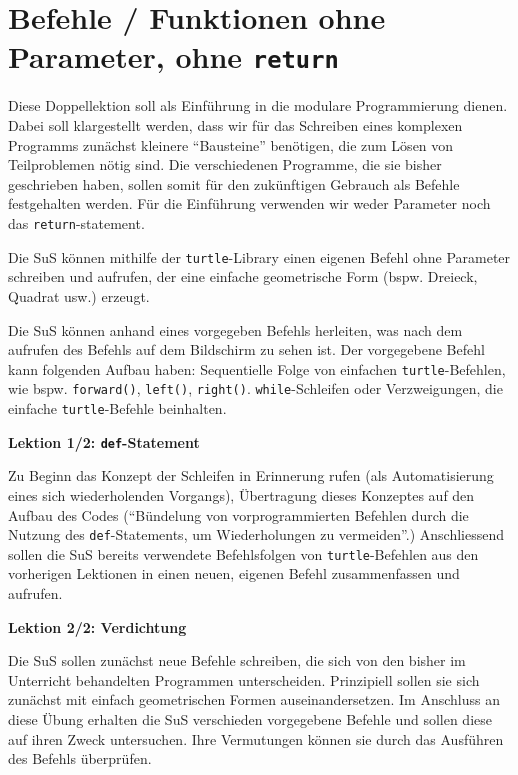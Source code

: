 \section{Befehle / Funktionen ohne Parameter, ohne \texorpdfstring{\lstinline|return|}{return}}
\begin{myExBox}
	Diese Doppellektion soll als Einführung in die modulare Programmierung dienen. Dabei soll klargestellt werden, dass wir für das Schreiben eines komplexen Programms zunächst kleinere \enquote{Bausteine} benötigen, die zum Lösen von Teilproblemen nötig sind. Die verschiedenen Programme, die sie bisher geschrieben haben, sollen somit für den zukünftigen Gebrauch als Befehle festgehalten werden. Für die Einführung verwenden wir weder Parameter noch das \lstinline|return|-statement.

	\begin{todolist}
		\item Die SuS können mithilfe der \lstinline|turtle|-Library einen eigenen Befehl ohne Parameter schreiben und aufrufen, der eine einfache geometrische Form (bspw. Dreieck, Quadrat usw.) erzeugt.
		\item Die SuS können anhand eines vorgegeben Befehls herleiten, was nach dem aufrufen des Befehls auf dem Bildschirm zu sehen ist. Der vorgegebene Befehl kann folgenden Aufbau haben: Sequentielle Folge von einfachen \lstinline|turtle|-Befehlen, wie bspw. \lstinline|forward()|, \lstinline|left()|, \lstinline|right()|. \lstinline|while|-Schleifen oder Verzweigungen, die einfache \lstinline|turtle|-Befehle beinhalten.
	\end{todolist}

	\textbf{Lektion 1/2:  \lstinline|def|-Statement}

	Zu Beginn das Konzept der Schleifen in Erinnerung rufen (als Automatisierung eines sich wiederholenden Vorgangs), Übertragung dieses Konzeptes auf den Aufbau des Codes (\enquote{Bündelung von vorprogrammierten Befehlen durch die Nutzung des \lstinline|def|-Statements, um Wiederholungen zu vermeiden}.) Anschliessend sollen die SuS bereits verwendete Befehlsfolgen von \lstinline|turtle|-Befehlen aus den vorherigen Lektionen in einen neuen, eigenen Befehl zusammenfassen und aufrufen.

	\textbf{Lektion 2/2: Verdichtung}

	Die SuS sollen zunächst neue Befehle schreiben, die sich von den bisher im Unterricht behandelten Programmen unterscheiden. Prinzipiell sollen sie sich zunächst mit einfach geometrischen Formen auseinandersetzen. Im Anschluss an diese Übung erhalten die SuS verschieden vorgegebene Befehle und sollen diese auf ihren Zweck untersuchen. Ihre Vermutungen können sie durch das Ausführen des Befehls überprüfen.


\end{myExBox}
